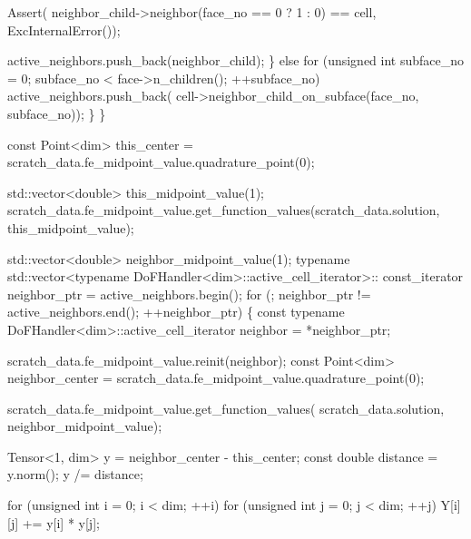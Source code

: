 \begin{DoxyCodeInclude}
                    Assert(
                        neighbor\_child->neighbor(face\_no == 0 ? 1 : 0) == cell,
                        ExcInternalError());

                    active\_neighbors.push\_back(neighbor\_child);
                \} \textcolor{keywordflow}{else}
                    \textcolor{keywordflow}{for} (\textcolor{keywordtype}{unsigned} \textcolor{keywordtype}{int} subface\_no = 0;
                         subface\_no < face->n\_children(); ++subface\_no)
                        active\_neighbors.push\_back(
                            cell->neighbor\_child\_on\_subface(face\_no,
                                                            subface\_no));
            \}
        \}

    \textcolor{keyword}{const} Point<dim> this\_center =
        scratch\_data.fe\_midpoint\_value.quadrature\_point(0);

    std::vector<double> this\_midpoint\_value(1);
    scratch\_data.fe\_midpoint\_value.get\_function\_values(scratch\_data.solution,
                                                       this\_midpoint\_value);


    std::vector<double> neighbor\_midpoint\_value(1);
    \textcolor{keyword}{typename} std::vector<typename DoFHandler<dim>::active\_cell\_iterator>::
        const\_iterator neighbor\_ptr = active\_neighbors.begin();
    \textcolor{keywordflow}{for} (; neighbor\_ptr != active\_neighbors.end(); ++neighbor\_ptr) \{
        \textcolor{keyword}{const} \textcolor{keyword}{typename} DoFHandler<dim>::active\_cell\_iterator neighbor =
            *neighbor\_ptr;

        scratch\_data.fe\_midpoint\_value.reinit(neighbor);
        \textcolor{keyword}{const} Point<dim> neighbor\_center =
            scratch\_data.fe\_midpoint\_value.quadrature\_point(0);

        scratch\_data.fe\_midpoint\_value.get\_function\_values(
            scratch\_data.solution, neighbor\_midpoint\_value);

        Tensor<1, dim> y = neighbor\_center - this\_center;
        \textcolor{keyword}{const} \textcolor{keywordtype}{double} distance = y.norm();
        y /= distance;

        \textcolor{keywordflow}{for} (\textcolor{keywordtype}{unsigned} \textcolor{keywordtype}{int} i = 0; i < dim; ++i)
            \textcolor{keywordflow}{for} (\textcolor{keywordtype}{unsigned} \textcolor{keywordtype}{int} j = 0; j < dim; ++j) Y[i][j] += y[i] * y[j];


\end{DoxyCodeInclude}
